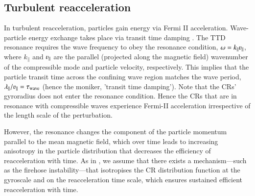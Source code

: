 \documentclass[fleqn,usenatbib,useAMS]{mnras}
\begin{document}
\subsection{Turbulent reacceleration}
\label{sec:reacc}

In turbulent reacceleration, particles gain energy via Fermi II acceleration. Wave-particle energy exchange takes place via transit time damping \citep[TTD,][]{brunetti07,brunetti11}. The
TTD resonance requires the wave frequency to obey the resonance
condition, $\omega=k_\parallel\varv_\parallel$, where $k_\parallel$
and $\varv_\parallel$ are the parallel (projected along the magnetic
field) wavenumber of the compressible mode and particle velocity, respectively. This implies
that the particle transit time across the confining wave region
matches the wave period,
$\lambda_{\parallel}/\varv_{\parallel}=\tau_{\rmn{wave}}$ (hence the moniker, 'transit time damping'). Note that the CRs'
gyroradius does not enter the resonance condition. Hence the CRs that
are in resonance with compressible waves experience Fermi-II
acceleration irrespective of the length scale of the perturbation.

However, the resonance changes the component of the particle momentum
parallel to the mean magnetic field, which over time leads to
increasing anisotropy in the particle distribution that decreases the
efficiency of reacceleration with time. As in \citet{brunetti11}, we
assume that there exists a mechanism---such as the firehose
instability---that isotropises the CR distribution function at the
gyroscale and on the reacceleration time scale, which ensures
sustained efficient reacceleration with time.
\end{document}
